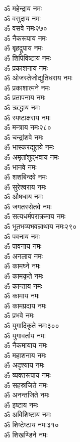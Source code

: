 \begin{multicols}{2}
\begin{flushleft}
ॐ महेन्द्राय नमः\\
ॐ वसुदाय नमः\\
ॐ वसवे नमः\hfill २७०\\
ॐ नैकरूपाय नमः\\
ॐ बृहद्रूपाय नमः\\
ॐ शिपिविष्टाय नमः\\
ॐ प्रकाशनाय नमः\\
ॐ ओजस्तेजोद्युतिधराय नमः\\
ॐ प्रकाशात्मने नमः\\
ॐ प्रतापनाय नमः\\
ॐ ऋद्धाय नमः\\
ॐ स्पष्टाक्षराय नमः\\
ॐ मन्त्राय नमः\hfill २८०\\
ॐ चन्द्रांशवे नमः\\
ॐ भास्करद्युतये नमः\\
ॐ अमृतांशूद्भवाय नमः\\
ॐ भानवे नमः\\
ॐ शशबिन्दवे नमः\\
ॐ सुरेश्वराय नमः\\
ॐ औषधाय नमः\\
ॐ जगतस्सेतवे नमः\\
ॐ सत्यधर्मपराक्रमाय नमः\\
ॐ भूतभव्यभवन्नाथाय नमः\hfill २९०\\
ॐ पवनाय नमः\\
ॐ पावनाय नमः\\
ॐ अनलाय नमः\\
ॐ कामघ्ने नमः\\
ॐ कामकृते नमः\\
ॐ कान्ताय नमः\\
ॐ कामाय नमः\\
ॐ कामप्रदाय नमः\\
ॐ प्रभवे नमः\\
ॐ युगादिकृते नमः\hfill ३००\\
ॐ युगावर्ताय नमः\\
ॐ नैकमायाय नमः\\
ॐ महाशनाय नमः\\
ॐ अदृश्याय नमः\\
ॐ व्यक्तरूपाय नमः\\
ॐ सहस्रजिते नमः\\
ॐ अनन्तजिते नमः\\
ॐ इष्टाय नमः\\
ॐ अविशिष्टाय नमः\\
ॐ शिष्टेष्टाय नमः\hfill ३१०\\
ॐ शिखण्डिने नमः\\

\end{flushleft}
\end{multicols}
